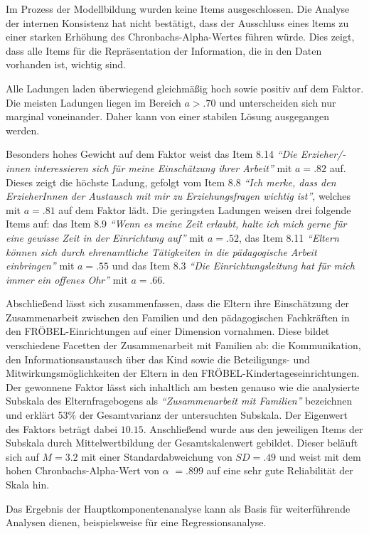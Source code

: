 \documentclass[12pt,a4paper]{article}
\begin{document}
Im Prozess der Modellbildung wurden keine Items ausgeschlossen. Die Analyse der internen Konsistenz hat nicht bestätigt, dass der Ausschluss eines ltems zu einer starken Erhöhung des Chronbachs-Alpha-Wertes führen würde. Dies zeigt, dass alle Items für die Repräsentation der Information, die in den Daten vorhanden ist, wichtig sind.

	Alle Ladungen laden überwiegend gleichmäßig hoch sowie positiv auf dem Faktor. Die meisten Ladungen liegen im Bereich $a >.70$ und unterscheiden sich nur marginal voneinander. Daher kann von einer stabilen Lösung ausgegangen werden.
	
	Besonders hohes Gewicht auf dem Faktor weist das Item 8.14 \textit{"`Die Erzieher/-innen interessieren sich für meine Einschätzung ihrer Arbeit"'} mit $a= .82$ auf. Dieses zeigt die höchste Ladung, gefolgt vom Item 8.8 \textit{"`Ich merke, dass den ErzieherInnen der Austausch mit mir zu Erziehungsfragen wichtig ist"'}, welches mit $a = .81$ auf dem Faktor lädt.
	Die geringsten Ladungen weisen drei folgende Items auf: das Item 8.9 \textit{"`Wenn es meine Zeit erlaubt, halte ich mich gerne für eine gewisse Zeit in der Einrichtung auf"'} mit $a = .52$, das Item 8.11 \textit{"`Eltern können sich durch ehrenamtliche Tätigkeiten in die pädagogische Arbeit einbringen"'} mit $a = .55$ und das Item 8.3 \textit{"`Die Einrichtungsleitung hat für mich immer ein offenes Ohr"'} mit $a = .66$.   
	
	Abschließend lässt sich zusammenfassen, dass die Eltern ihre Einschätzung der Zusammenarbeit zwischen den Familien und den pädagogischen Fachkräften in den FRÖBEL-Einrichtungen auf einer Dimension vornahmen. Diese bildet verschiedene Facetten der Zusammenarbeit mit Familien ab: die Kommunikation, den Informationsaustausch über das Kind sowie die Beteiligungs- und Mitwirkungsmöglichkeiten der Eltern in den FRÖBEL-Kindertageseinrichtungen. Der gewonnene Faktor lässt sich inhaltlich am besten genauso wie die analysierte Subskala des Elternfragebogens als \textit{"`Zusammenarbeit mit Familien"'} bezeichnen und erklärt 53\% der Gesamtvarianz der untersuchten Subskala. Der Eigenwert des Faktors beträgt dabei $10.15$.
	Anschließend wurde aus den jeweiligen Items der Subskala durch Mittelwertbildung der Gesamtskalenwert gebildet. Dieser beläuft sich auf  $M = 3.2$ mit einer Standardabweichung von $SD = .49$ und weist mit dem hohen Chronbachs-Alpha-Wert von $\alpha$ $= .899$ auf eine sehr gute Reliabilität der Skala hin.
	
	Das Ergebnis der Hauptkomponentenanalyse kann als Basis für weiterführende Analysen dienen, beispielsweise für eine Regressionsanalyse.
	
\end{document}
